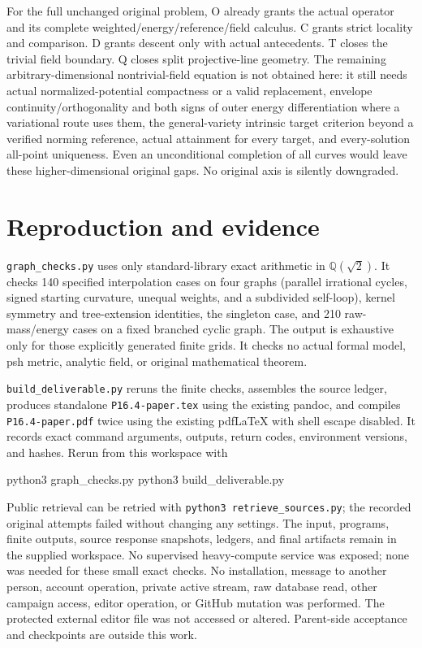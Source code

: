 \documentclass[
  11pt,
]{article}
\newenvironment{Shaded}{}{}
\newcommand{\ExtensionTok}[1]{#1}
\newcommand{\NormalTok}[1]{#1}
\begin{document}
For the full unchanged original problem, O already grants the actual
operator and its complete weighted/energy/reference/field calculus. C
grants strict locality and comparison. D grants descent only with actual
antecedents. T closes the trivial field boundary. Q closes split
projective-line geometry. The remaining arbitrary-dimensional
nontrivial-field equation is not obtained here: it still needs actual
normalized-potential compactness or a valid replacement, envelope
continuity/orthogonality and both signs of outer energy differentiation
where a variational route uses them, the general-variety intrinsic
target criterion beyond a verified norming reference, actual attainment
for every target, and every-solution all-point uniqueness. Even an
unconditional completion of all curves would leave these
higher-dimensional original gaps. No original axis is silently
downgraded.

\section{Reproduction and evidence}\label{reproduction-and-evidence}

\texttt{graph\_checks.py} uses only standard-library exact arithmetic in
\(\mathbb Q(\sqrt2)\). It checks 140 specified interpolation cases on
four graphs (parallel irrational cycles, signed starting curvature,
unequal weights, and a subdivided self-loop), kernel symmetry and
tree-extension identities, the singleton case, and 210 raw-mass/energy
cases on a fixed branched cyclic graph. The output is exhaustive only
for those explicitly generated finite grids. It checks no actual formal
model, psh metric, analytic field, or original mathematical theorem.

\texttt{build\_deliverable.py} reruns the finite checks, assembles the
source ledger, produces standalone \texttt{P16.4-paper.tex} using the
existing pandoc, and compiles \texttt{P16.4-paper.pdf} twice using the
existing pdfLaTeX with shell escape disabled. It records exact command
arguments, outputs, return codes, environment versions, and hashes.
Rerun from this workspace with

\begin{Shaded}
\begin{Highlighting}[]
\ExtensionTok{python3}\NormalTok{ graph\_checks.py}
\ExtensionTok{python3}\NormalTok{ build\_deliverable.py}
\end{Highlighting}
\end{Shaded}

Public retrieval can be retried with
\texttt{python3\ retrieve\_sources.py}; the recorded original attempts
failed without changing any settings. The input, programs, finite
outputs, source response snapshots, ledgers, and final artifacts remain
in the supplied workspace. No supervised heavy-compute service was
exposed; none was needed for these small exact checks. No installation,
message to another person, account operation, private active stream, raw
database read, other campaign access, editor operation, or GitHub
mutation was performed. The protected external editor file was not
accessed or altered. Parent-side acceptance and checkpoints are outside
this work.
\end{document}
